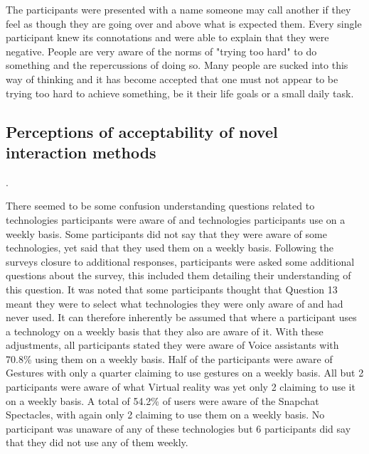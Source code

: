 \documentclass{l4proj}
\begin{document}
The participants were presented with a name someone may call another if they feel as though they are going over and above what is expected them. Every single participant knew its connotations and were able to explain that they were negative. People are very aware of the norms of "trying too hard" to do something and the repercussions of doing so. Many people are sucked into this way of thinking and it has become accepted that one must not appear to be trying too hard to achieve something, be it their life goals or a small daily task.

\subsection{Perceptions of acceptability of novel interaction methods}.

There seemed to be some confusion understanding questions related to technologies participants were aware of and technologies participants use on a weekly basis. Some participants did not say that they were aware of some technologies, yet said that they used them on a weekly basis. Following the surveys closure to additional responses, participants were asked some additional questions about the survey, this included them detailing their understanding of this question. It was noted that some participants thought that Question 13 meant they were to select what technologies they were only aware of and had never used. It can therefore inherently be assumed that where a participant uses a technology on a weekly basis that they also are aware of it. With these adjustments, all participants stated they were aware of Voice assistants with 70.8\% using them on a weekly basis. Half of the participants were aware of Gestures with only a quarter claiming to use gestures on a weekly basis. All but 2 participants were aware of what Virtual reality was yet only 2 claiming to use it on a weekly basis. A total of 54.2\% of users were aware of the Snapchat Spectacles, with again only 2 claiming to use them on a weekly basis. No participant was unaware of any of these technologies but 6 participants did say that they did not use any of them weekly.
\end{document}
